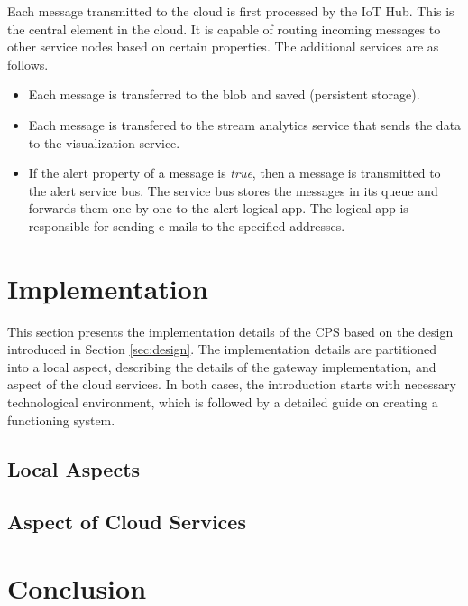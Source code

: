 \documentclass[a4paper, 11pt]{article}
\begin{document}
	Each message transmitted to the cloud is first processed by the IoT Hub. This is the central element in the cloud. It is 		capable of routing incoming messages to other service nodes based on certain properties. The additional services are as follows.
	 \begin{itemize}
	 	\item Each message is transferred to the blob and saved (persistent storage).
		\item Each message is transfered to the stream analytics service that sends the data to the visualization service.
	 	\item If the alert property of a message is \textsl{true}, then a message is transmitted to the alert service bus. The service bus stores the messages in its queue and forwards them one-by-one to the alert logical app. The logical app is responsible for sending e-mails to the specified addresses.
	 \end{itemize}
	
	\section{Implementation}
	\label{sec:implementation}
	This section presents the implementation details of the CPS based on the design introduced in Section \ref{sec:design}. The implementation details are partitioned into a local aspect, describing the details of the gateway implementation, and aspect of the cloud services. In both cases, the introduction starts with necessary technological environment, which is followed by a detailed guide on creating a functioning system.
	
	\subsection{Local Aspects}
	
	\subsection{Aspect of Cloud Services}
	
	\section{Conclusion}
	
\end{document}
